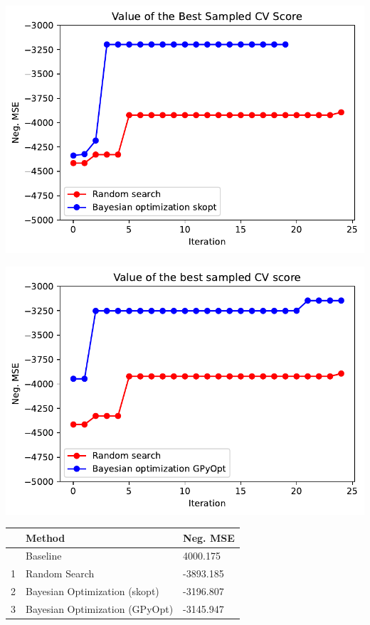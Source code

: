 \documentclass[
  12pt,
  letterpaper,
  DIV=11,
  numbers=noendperiod]{scrartcl}
\begin{document}
\includegraphics{ProyFinal_OptBayesiana_2024_files/figure-pdf/cell-16-output-1.pdf}

\includegraphics{ProyFinal_OptBayesiana_2024_files/figure-pdf/cell-17-output-1.pdf}

\begin{longtable}[]{@{}lll@{}}
\toprule\noalign{}
& Method & Neg. MSE \\
\midrule\noalign{}
\endhead
\bottomrule\noalign{}
\endlastfoot
0 & Baseline & 4000.175 \\
1 & Random Search & -3893.185 \\
2 & Bayesian Optimization (skopt) & -3196.807 \\
3 & Bayesian Optimization (GPyOpt) & -3145.947 \\
\end{longtable}
\end{document}
